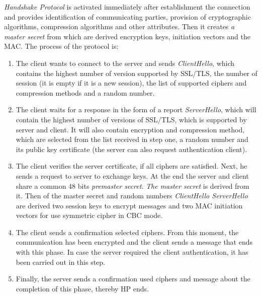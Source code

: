 \documentclass[
  digital, %
  notable,   %
  lof,     %
  lot,     %
]{fithesis3}
\begin{document}
\textit{Handshake Protocol} is activated immediately after establishment the connection and 
provides identification of communicating parties, provision of cryptographic algorithms, 
compression algorithms and other attributes. Then it creates \textit{a master secret} from which 
are derived encryption keys, initiation vectors and the MAC. The process of the protocol is:
\vskip0.2in
\begin{enumerate}
\item The client wants to connect to the server and sends \textit{ClientHello}, which contains 
the highest number of version supported by SSL/TLS, the number of session (it is empty if it is 
a new session), the list of supported ciphers and compression methods and a random number.
\item The client waits for a response in the form of a report \textit{ServerHello}, which will 
contain the highest number of versions of SSL/TLS, which is supported by server and client. It 
will also contain encryption and compression method, which are selected from the list received 
in step one, a random number and its public key certificate (the server can also request 
authentication client).
\item The client verifies the server certificate, if all ciphers are satisfied. Next, he sends 
a request to server to exchange keys. At the end the server and client share a common 48 bits 
\textit{premaster secret}. \textit{The master secret} is derived from it. Then of the master 
secret and random numbers \textit{ClientHello ServerHello} are derived two session keys to 
encrypt messages and two MAC initiation vectors for use symmetric cipher in CBC mode. 
\item The client sends a confirmation selected ciphers. From this moment, the communication has 
been encrypted and the client sends a message that ends with this phase. In case the server 
required the client authentication, it has been carried out in this step. 
\item Finally, the server sends a confirmation used ciphers and message about the completion of 
this phase, thereby HP ends.
\end{enumerate}

\end{document}
